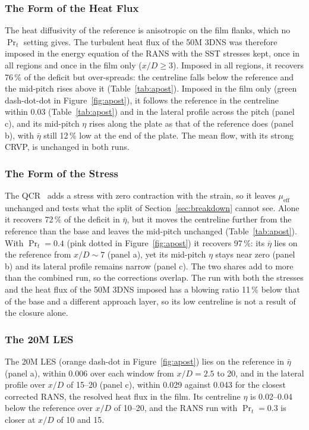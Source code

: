 \documentclass[colorlinks,upint,subscriptcorrection,varvw,hyphenate,balance,lineno]{asmeconf}
\newcommand*{\meff}{\mu_{\mathrm{eff}}}
\newcommand*{\etab}{\bar\eta}
\begin{document}
\subsubsection{The Form of the Heat Flux}

The heat diffusivity of the reference is anisotropic on the film flanks, which no $\Pr_t$ setting gives. The
turbulent heat flux of the 50M 3DNS was therefore imposed in the energy equation of the RANS with the SST stresses
kept, once in all regions and once in the film only ($x/D\geq3$). Imposed in all regions, it recovers 76\,\% of
the deficit but over-spreads: the centreline falls below the reference and the mid-pitch rises above it
(Table~\ref{tab:apost}). Imposed in the film only (green dash-dot-dot in Figure~\ref{fig:apost}), it follows the
reference in the centreline within 0.03 (Table~\ref{tab:apost}) and in the lateral profile across the pitch
(panel c), and its mid-pitch $\eta$ rises along the plate as that of the reference does (panel b), with $\etab$ still 12\,\% low at
the end of the plate. The mean flow, with its strong CRVP, is unchanged in both runs.

\subsubsection{The Form of the Stress}

The QCR~\cite{spalart2000} adds a stress with zero contraction with the strain, so it leaves $\meff$ unchanged and
tests what the split of Section~\ref{sec:breakdown} cannot see. Alone it recovers 72\,\% of the deficit in $\etab$,
but it moves the centreline further from the reference than the base and leaves the mid-pitch unchanged
(Table~\ref{tab:apost}). With $\Pr_t=0.4$ (pink dotted in Figure~\ref{fig:apost}) it recovers 97\,\%: its $\etab$
lies on the reference from $x/D\sim7$ (panel a), yet its mid-pitch $\eta$ stays near zero (panel b) and its
lateral profile remains narrow (panel c). The two shares add to more than the combined run, so the corrections overlap. The
run with both the stresses and the heat flux of the 50M 3DNS imposed has a blowing ratio 11\,\% below that of the
base and a different approach layer, so its low centreline is not a result of the closure alone.

\subsubsection{The 20M LES}

The 20M LES (orange dash-dot in Figure~\ref{fig:apost}) lies on the reference in $\etab$ (panel a), within 0.006
over each window from $x/D=2.5$ to 20, and in the lateral profile over $x/D$ of 15--20 (panel c), within 0.029
against 0.043 for the closest corrected RANS, the resolved heat flux in the film. Its centreline $\eta$ is
0.02--0.04 below the reference over $x/D$ of 10--20, and the RANS run with $\Pr_t=0.3$ is closer at $x/D$ of 10 and
15.
\end{document}
